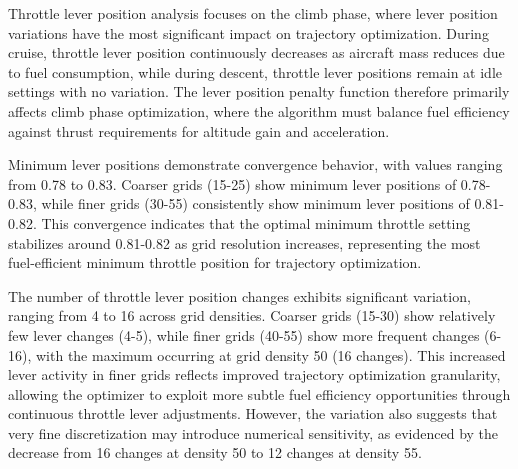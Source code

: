 Throttle lever position analysis focuses on the climb phase, where lever position variations have the most significant impact on trajectory optimization. During cruise, throttle lever position continuously decreases as aircraft mass reduces due to fuel consumption, while during descent, throttle lever positions remain at idle settings with no variation. The lever position penalty function therefore primarily affects climb phase optimization, where the algorithm must balance fuel efficiency against thrust requirements for altitude gain and acceleration.

Minimum lever positions demonstrate convergence behavior, with values ranging from 0.78 to 0.83. Coarser grids (15-25) show minimum lever positions of 0.78-0.83, while finer grids (30-55) consistently show minimum lever positions of 0.81-0.82. This convergence indicates that the optimal minimum throttle setting stabilizes around 0.81-0.82 as grid resolution increases, representing the most fuel-efficient minimum throttle position for trajectory optimization.

The number of throttle lever position changes exhibits significant variation, ranging from 4 to 16 across grid densities. Coarser grids (15-30) show relatively few lever changes (4-5), while finer grids (40-55) show more frequent changes (6-16), with the maximum occurring at grid density 50 (16 changes). This increased lever activity in finer grids reflects improved trajectory optimization granularity, allowing the optimizer to exploit more subtle fuel efficiency opportunities through continuous throttle lever adjustments. However, the variation also suggests that very fine discretization may introduce numerical sensitivity, as evidenced by the decrease from 16 changes at density 50 to 12 changes at density 55.

